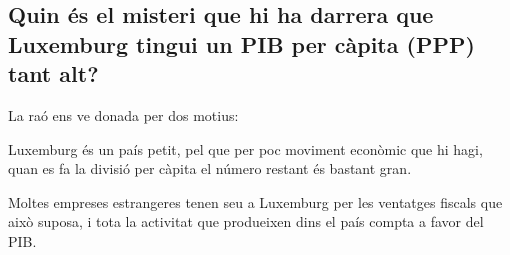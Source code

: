 \subsection{Quin és el misteri que hi ha darrera que Luxemburg tingui un 
PIB per càpita (PPP) tant alt?}

La raó ens ve donada per dos motius:

Luxemburg és un país petit, pel que per poc moviment econòmic que hi hagi,
quan es fa la divisió per càpita el número restant és bastant gran.

Moltes empreses estrangeres tenen seu a Luxemburg per les ventatges fiscals
que això suposa, i tota la activitat que produeixen dins el país compta 
a favor del PIB\cite{luxembourgh_high_gdp}.
